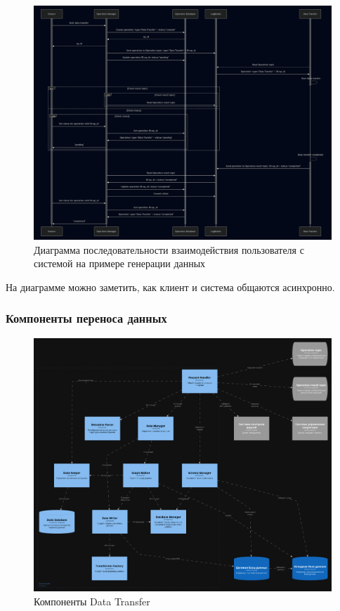 \begin{figure}
  \includegraphics[scale=0.2]{./img/mermaid-sequence-User-MainSystem.png}
  \caption{Диаграмма последовательности взаимодействия пользователя с системой на примере генерации данных}
  \label{Sequence User-MainSystem}
\end{figure}

На диаграмме можно заметить, как клиент и система общаются асинхронно.

\subsubsection{Компоненты переноса данных}

\begin{figure}
  \includegraphics[scale=0.12]{./img/structurizr-DataTransferComponents.png}
  \caption{Компоненты Data Transfer}
  \label{Data Transfer Components}
\end{figure}

